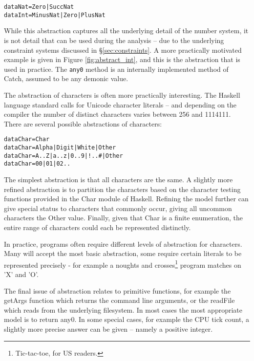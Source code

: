 \documentclass[preprint]{sigplanconf}
\newcommand{\T}[1]{\texttt{#1}}
\newcommand{\C}[1]{\textsf{#1}}
\newenvironment{code}{\begin{alltt}\small}{\end{alltt}}
\begin{document}
\begin{code}
data Nat  = Zero | Succ Nat
data Int  = Minus Nat | Zero | Plus Nat
\end{code}

While this abstraction captures all the underlying detail of the number system, it is not detail that can be used during the analysis -- due to the underlying constraint systems discussed in \S\ref{sec:constraints}. A more practically motivated example is given in Figure \ref{fig:abstract_int}, and this is the abstraction that is used in practice. The \T{any0} method is an internally implemented method of Catch, assumed to be any demonic value.

The abstraction of characters is often more practically interesting. The Haskell language standard calls for Unicode character literals -- and depending on the compiler the number of distinct characters varies between 256 and 1114111. There are several possible abstractions of characters:

\begin{code}
data Char = Char
data Char = Alpha | Digit | White | Other
data Char = A .. Z | a .. z | 0 .. 9 | ! .. # | Other
data Char = 00 | 01 | 02 ..
\end{code}

The simplest abstraction is that all characters are the same. A slightly more refined abstraction is to partition the characters based on the character testing functions provided in the \C{Char} module of Haskell. Refining the model further can give special status to characters that commonly occur, giving all uncommon characters the \C{Other} value. Finally, given that \C{Char} is a finite enumeration, the entire range of characters could each be represented distinctly.

In practice, programs often require different levels of abstraction for characters. Many will accept the most basic abstraction, some require certain literals to be represented precisely - for example a noughts and crosses\footnote{Tic-tac-toe, for US readers.} program matches on 'X' and 'O'.

The final issue of abstraction relates to primitive functions, for example the \C{getArgs} function which returns the command line arguments, or the \C{readFile} which reads from the underlying filesystem. In most cases the most appropriate model is to return \C{any0}. In some special cases, for example the CPU tick count, a slightly more precise answer can be given -- namely a positive integer.
\end{document}
